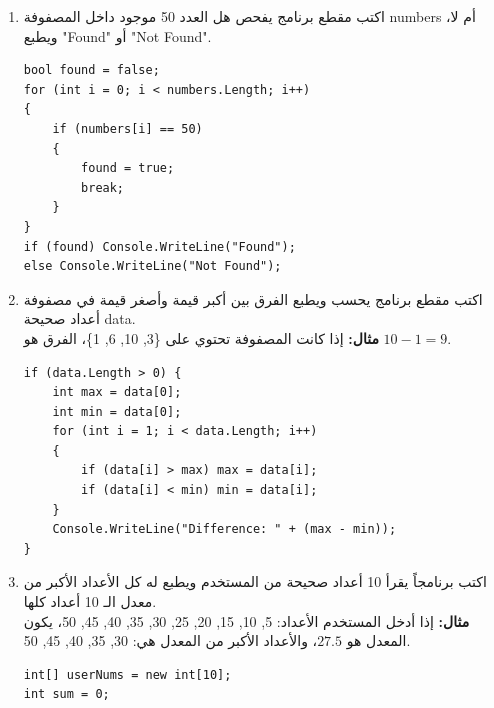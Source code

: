 \documentclass[14pt]{extarticle}
\begin{document}
\begin{enumerate}[itemsep=2em]
    \item
    اكتب مقطع برنامج يفحص هل العدد \textenglish{50} موجود داخل المصفوفة \textenglish{numbers} أم لا، ويطبع \textenglish{"Found"} أو \textenglish{"Not Found"}.
    \ifwithsols
    \begin{boxSolution}
    \begin{english}
    \begin{verbatim}
bool found = false;
for (int i = 0; i < numbers.Length; i++)
{
    if (numbers[i] == 50)
    {
        found = true;
        break;
    }
}
if (found) Console.WriteLine("Found");
else Console.WriteLine("Not Found");
    \end{verbatim}
    \end{english}
    \end{boxSolution}
    \fi

    \item
    اكتب مقطع برنامج يحسب ويطبع الفرق بين أكبر قيمة وأصغر قيمة في مصفوفة أعداد صحيحة \textenglish{data}.\\
    \textbf{مثال:} إذا كانت المصفوفة تحتوي على \textenglish{\{3, 10, 6, 1\}}، الفرق هو $10 - 1 = 9$.
    \ifwithsols
    \begin{boxSolution}
    \begin{english}
    \begin{verbatim}
if (data.Length > 0) {
    int max = data[0];
    int min = data[0];
    for (int i = 1; i < data.Length; i++)
    {
        if (data[i] > max) max = data[i];
        if (data[i] < min) min = data[i];
    }
    Console.WriteLine("Difference: " + (max - min));
}
    \end{verbatim}
    \end{english}
    \end{boxSolution}
    \fi

    \item
    اكتب برنامجاً يقرأ 10 أعداد صحيحة من المستخدم ويطبع له كل الأعداد الأكبر من معدل الـ 10 أعداد كلها.\\
    \textbf{مثال:} إذا أدخل المستخدم الأعداد: 5, 10, 15, 20, 25, 30, 35, 40, 45, 50، يكون المعدل هو $27.5$، والأعداد الأكبر من المعدل هي: 30, 35, 40, 45, 50.
    \ifwithsols
    \begin{boxSolution}
    \begin{english}
    \begin{verbatim}
int[] userNums = new int[10];
int sum = 0;


\end{verbatim}
\end{english}
\end{boxSolution}
\end{enumerate}
\end{document}
